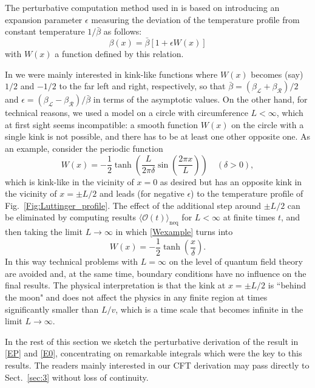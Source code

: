 \documentclass[12pt,a4paper]{article}
\newcommand{\cL}{\mathcal{L}}
\newcommand{\cO}{\mathcal{O}}
\newcommand{\cR}{\mathcal{R}}
\theoremstyle{definition}
\theoremstyle{remark}
\begin{document}
The perturbative computation method used in \cite{LLMM2} is based
on introducing an expansion parameter $\epsilon$ measuring the deviation
of the temperature profile from constant temperature $1/\bar\beta$ as follows:
%
\begin{equation} 
\label{betaeps} 
\beta(x) = \bar\beta \left[ 1+\epsilon W(x) \right]
\end{equation}
%
with $W(x)$ a function defined by this relation. 

In \cite{LLMM2} we were mainly interested in kink-like functions where $W(x)$ becomes (say) $1/2$ and $-1/2$ to the far left and right, respectively, so that
$\bar\beta=(\beta_\cL+\beta_\cR)/2$ and
$\epsilon=(\beta_\cL-\beta_\cR)/\bar\beta$ in terms of the asymptotic values. 
On the other hand, for technical reasons, we used a model on a circle with
circumference 
$L<\infty$, which at first sight seems incompatible: a smooth function $W(x)$ on the circle with a single kink is not possible, and there has to be at least one other opposite one.
As an example, consider the periodic function
%
\begin{equation}
\label{Wexample}
W(x)
= - \frac{1}{2} \tanh \left(
		\frac{L}{2\pi\delta} \sin \left( \frac{2\pi x}{L} \right)
	\right)
\quad
(\delta>0),
\end{equation}
%
which is kink-like in the vicinity of $x=0$ as desired but has an opposite kink in the vicinity of $x=\pm L/2$ and leads (for negative $\epsilon$) to the
temperature profile of Fig.~\ref{Fig:Luttinger_profile}.
The effect of the additional step around $\pm L/2$ can be eliminated by computing results $\langle\cO(t)\rangle_{\text{neq}}$ for $L < \infty$ at finite times $t$, and then taking the limit $L\to\infty$ \cite{LLMM2} in which \eqref{Wexample} turns into
\begin{equation}
\label{Winfty}
W(x)= -\frac{1}{2} \tanh \left(\frac{x}{\delta}\right).
\end{equation}
In this way technical problems with $L=\infty$ on the level of quantum field theory are avoided and, at the same time, boundary conditions have no influence on the final results.
The physical interpretation is that the kink at $x = \pm L/2$ is ``behind the moon" and does not affect the physics in any finite region at times significantly smaller than $L/v$, which is a time scale that becomes infinite in the limit $L\to\infty$. 

In the rest of this section we sketch the perturbative derivation of the result in \eqref{EP} and \eqref{E0}, concentrating on remarkable integrals which were the key to this results.
The readers mainly interested in our CFT derivation may pass 
directly to Sect.~\ref{sec:3} without loss of continuity.  
\end{document}
